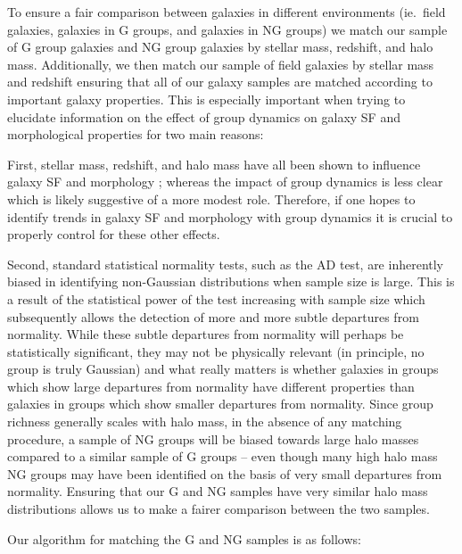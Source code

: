 \documentclass[a4paper,fleqn,usenatbib]{mnras}
\begin{document}
To ensure a fair comparison between galaxies in different environments
(ie.\ field galaxies, galaxies in G groups, and galaxies in NG groups)
we match our sample of G group galaxies and NG group galaxies by
stellar mass, redshift, and halo mass.  Additionally, we then match
our sample of field galaxies by stellar mass and redshift ensuring
that all of our galaxy samples are matched according to important galaxy
properties.  This is especially important when trying to elucidate
information on the effect of group dynamics on galaxy SF and
morphological properties for
two main reasons:
\par
First, stellar mass, redshift, and halo mass have
all been shown to influence galaxy SF and morphology
\citep[e.g.][]{brinchmann2004, feulner2005, zheng2007, cucciati2012,
  wetzel2012, lackner2013, tasca2014}; whereas
the impact of group dynamics is less clear \citep{hou2013,
  ribeiro2013} which is likely suggestive of a more modest role.
Therefore,
if one hopes to identify trends in galaxy SF and morphology with group
dynamics it is crucial to properly control for these other effects.
\par
Second, standard statistical normality tests, such as the AD test, are
inherently biased in identifying non-Gaussian distributions when
sample size is large.  This is a result of the statistical power of
the test increasing with sample size which subsequently allows the
detection of more and more subtle departures from normality.  While these subtle
departures from normality will perhaps be statistically significant,
they may not be physically relevant (in
principle, no group is truly Gaussian) and what really matters is
whether galaxies in groups which show large departures from normality
have different properties than galaxies in groups which show smaller
departures from normality. Since group
richness generally scales with halo mass, in the absence of any matching
procedure, a sample of NG groups will be biased towards large halo
masses compared to a similar sample of G groups -- even though many
high halo mass NG groups may have been identified on the basis of very
small departures from normality.  Ensuring that our G and NG
samples have very similar halo mass distributions allows us to make a
fairer comparison between the two samples.
\par
Our algorithm for matching the G and NG samples is as follows:
\end{document}
